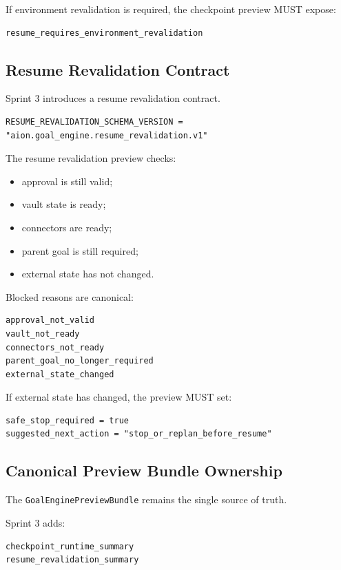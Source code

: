 If environment revalidation is required, the checkpoint preview MUST expose:

\begin{verbatim}
resume_requires_environment_revalidation
\end{verbatim}

\subsection{Resume Revalidation Contract}

Sprint 3 introduces a resume revalidation contract.

\begin{verbatim}
RESUME_REVALIDATION_SCHEMA_VERSION = "aion.goal_engine.resume_revalidation.v1"
\end{verbatim}

The resume revalidation preview checks:

\begin{itemize}
  \item approval is still valid;
  \item vault state is ready;
  \item connectors are ready;
  \item parent goal is still required;
  \item external state has not changed.
\end{itemize}

Blocked reasons are canonical:

\begin{verbatim}
approval_not_valid
vault_not_ready
connectors_not_ready
parent_goal_no_longer_required
external_state_changed
\end{verbatim}

If external state has changed, the preview MUST set:

\begin{verbatim}
safe_stop_required = true
suggested_next_action = "stop_or_replan_before_resume"
\end{verbatim}

\subsection{Canonical Preview Bundle Ownership}

The \texttt{GoalEnginePreviewBundle} remains the single source of truth.

Sprint 3 adds:

\begin{verbatim}
checkpoint_runtime_summary
resume_revalidation_summary
\end{verbatim}

